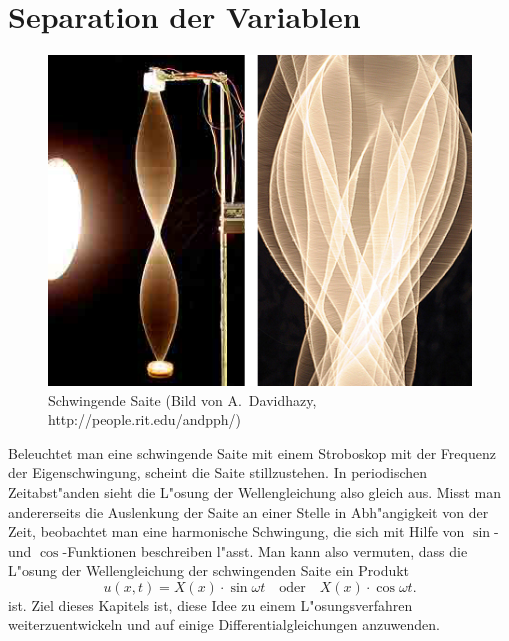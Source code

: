 %
%
%
\rhead{}
\chapter{Separation der Variablen\label{chapter-separation}}
\begin{figure}
\begin{center}
\includegraphics[width=0.8\hsize]{graphics/stringvibrlarge-10-06-06.jpg}
\end{center}
\caption{Schwingende Saite (Bild von A.~Davidhazy, http://people.rit.edu/andpph/)
\label{separation:schwingendesaite}}
\end{figure}
Beleuchtet man eine schwingende Saite mit einem Stroboskop mit der
Frequenz der Eigenschwingung, scheint die Saite stillzustehen. 
In periodischen Zeit\-ab\-st"an\-den sieht die L"osung der Wellengleichung
also gleich aus.
Misst man andererseits die Auslenkung der Saite
an einer Stelle in Abh"angigkeit von der Zeit, beobachtet man
eine harmonische Schwingung, die sich mit Hilfe von $\sin$- und
$\cos$-Funktionen beschreiben l"asst. Man kann also vermuten,
dass die L"osung der Wellengleichung der schwingenden Saite
ein Produkt
\[
u(x,t)=X(x)\cdot\sin\omega t\quad\text{oder}\quad X(x)\cdot\cos\omega t.
\]
ist. Ziel dieses Kapitels ist, diese Idee zu einem L"osungsverfahren
weiterzuentwickeln und auf einige Differentialgleichungen anzuwenden.

